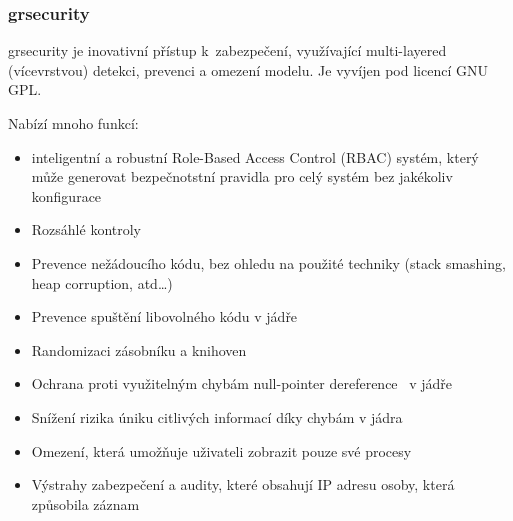 \documentclass[a4paper,12pt]{article}
\begin{document}


\subsubsection{grsecurity}
grsecurity je inovativní přístup k~zabezpečení, využívající multi-layered (vícevrstvou) detekci, prevenci a omezení modelu. Je vyvíjen pod licencí GNU GPL.~\cite{Grsecurity}

Nabízí mnoho funkcí:
\begin{itemize}
 \item inteligentní a robustní Role-Based Access Control (RBAC) systém, který může generovat bezpečnotstní pravidla pro celý systém bez jakékoliv konfigurace
 \item Rozsáhlé kontroly
 \item Prevence nežádoucího kódu, bez ohledu na použité techniky (stack smashing, heap corruption, atd…)
 \item Prevence spuštění libovolného kódu v jádře
 \item Randomizaci zásobníku a knihoven
 \item Ochrana proti využitelným chybám null-pointer dereference~\cite{Null-pointerDereference} v jádře
 \item Snížení rizika úniku citlivých informací díky chybám v jádra
 \item Omezení, která umožňuje uživateli zobrazit pouze své procesy
 \item Výstrahy zabezpečení a audity, které obsahují IP adresu osoby, která způsobila záznam
\end{itemize}
\end{document}
